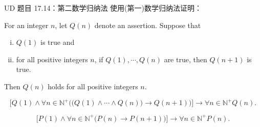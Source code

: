 
\begin{frame}{}
  \begin{exampleblock}{UD 题目 17.14：第二数学归纳法}
    使用(第一)数学归纳法证明：
    \begin{theorem}
      For an integer $n$, let $Q(n)$ denote an assertion. Suppose that
      \begin{enumerate}[(i)]
	\item $Q(1)$ is true and
	\item for all positive integers $n$, if $Q(1), \cdots, Q(n)$ are true,
	  then $Q(n+1)$ is true.
      \end{enumerate}
      Then $Q(n)$ holds for all positive integers $n$.
    \end{theorem}
  \end{exampleblock}
\end{frame}

\begin{frame}{}
  \begin{theorem}[第二数学归纳法]
    \[
      \Big[ Q(1) \land \forall n \in \mathbb{N}^{+} \Big(\big(Q(1) \land \cdots \land Q(n)\big) \to Q(n+1) \Big) \Big] 
	\to \forall n \in \mathbb{N}^{+} Q(n).
    \]
  \end{theorem}

  \pause
  \vspace{0.50cm}
  \begin{theorem}[(第一) 数学归纳法]
    \[
      \Big[ P(1) \land \forall n \in \mathbb{N}^{+} \big(P(n) \to P(n+1) \big) \Big]
	\to \forall n \in \mathbb{N}^{+} P(n).
    \]
  \end{theorem}
\end{frame}

% 
% 

